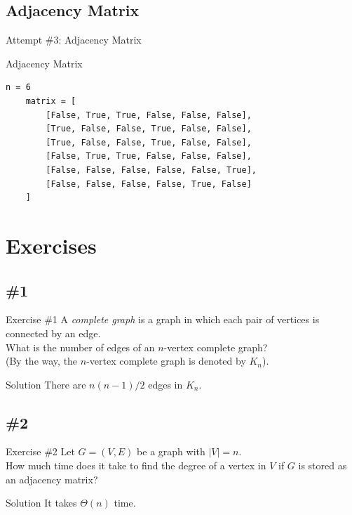 \documentclass{beamer}
\begin{document}
\subsection{Adjacency Matrix}
\begin{frame}[fragile]{Attempt \#3: Adjacency Matrix}
  \begin{block}{Adjacency Matrix}
    \scriptsize
    \begin{lstlisting}[gobble=4]
    n = 6
    matrix = [
        [False, True, True, False, False, False],
        [True, False, False, True, False, False],
        [True, False, False, True, False, False],
        [False, True, True, False, False, False],
        [False, False, False, False, False, True],
        [False, False, False, False, True, False]
    ]
    \end{lstlisting}
  \end{block}
\end{frame}

\section{Exercises}
\subsection{\#1}
\begin{frame}{Exercise \#1}
  A \emph{complete graph} is a graph in which each pair of vertices is
  connected by an edge. \pause \\[.5em]
  What is the number of edges of an $n$-vertex complete graph? \\
  (By the way, the $n$-vertex complete graph is denoted by $K_n$). \pause
  \begin{block}{Solution}
    There are $n(n-1)/2$ edges in $K_n$.
  \end{block}
\end{frame}

\subsection{\#2}
\begin{frame}{Exercise \#2}
  Let $G = (V, E)$ be a graph with $|V| = n$. \pause \\[.5em]
  How much time does it take to find the degree of a vertex in $V$
  if $G$ is stored as an adjacency matrix? \pause
  \begin{block}{Solution}
    It takes $\Theta(n)$ time.
  \end{block}
\end{frame}
\end{document}
